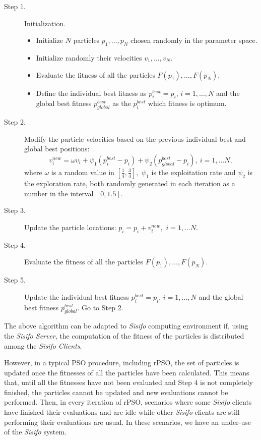 \begin{description}
	\item[Step 1.] Initialization.
	\begin{itemize}
		\item Initialize $N$ particles $p_1, \ldots, p_N$ chosen randomly in the parameter space.
		\item Initialize randomly their velocities $v_1, \ldots, v_N$.
		\item Evaluate the fitness of all the particles $F(p_1), \ldots, F(p_N)$.
		\item Define the individual best fitness as $p_i^{best} = p_i$, $i=1,\ldots,N$ and the global best fitness $p_{global}^{best}$ as the $p_i^{best}$ which fitness is optimum.
	\end{itemize}
	\item[Step 2.] Modify the particle velocities based on the previous individual best and global best positions: 
	\[v_i^{new} = \omega v_i + \psi_1 ( p_i^{best} - p_i ) + \psi_2 ( p_{global}^{best} - p_i ), \ i=1,\ldots N, \]
	where $\omega$ is a random value in $[\frac{1}{4}, \frac{3}{4}],$ $\psi_1$ is the exploitation rate and $\psi_2$ is the exploration rate, both randomly generated in each iteration as a number in the interval $[0,1.5]$.
	\item[Step 3.] Update the particle locations: $p_i = p_i + v_i^{new},$  $i=1,\ldots N$. 
	\item[Step 4.] Evaluate the fitness of all the particles $F(p_1), \ldots, F(p_N)$. 
	\item[Step 5.] Update the individual best fitness $p_i^{best} = p_i$, $i=1,\ldots,N$ and  the global best fitness $p_{global}^{best}$. Go to Step 2. 
\end{description}

The above algorithm can be adapted to \textit{Sisifo} computing environment if, using the \textit{Sisifo Server}, the computation of the fitness of the particles is distributed among the \textit{Sisifo Clients}.

However, in a typical PSO procedure, including rPSO, the set of particles is updated once the fitnesses of all the particles have been calculated. This means that, until all the fitnesses have not been evaluated and Step 4 is not completely finished, the particles cannot be updated and new evaluations cannot be performed. Then, in every iteration of rPSO, scenarios where some \textit{Sisifo} clients have finished their evaluations and are idle while other \textit{Sisifo} clients are still performing their evaluations are usual. In these scenarios, we have an under-use of the \textit{Sisifo} system.

